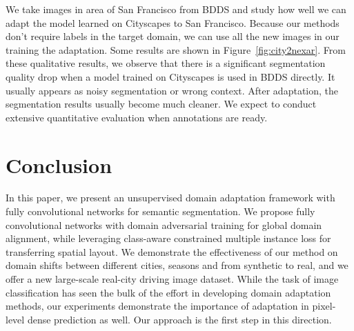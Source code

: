 \documentclass[10pt,twocolumn,letterpaper]{article}
\begin{document}
We take  images in area of San Francisco from BDDS and study how well we can adapt the model learned on Cityscapes to San Francisco. Because our methods don't require labels in the target domain, we can use all the new images in our training the adaptation. Some results are shown in Figure~\ref{fig:city2nexar}. From these qualitative results, we observe that there is a significant segmentation quality drop when a model trained on Cityscapes is used in BDDS directly. It usually appears as noisy segmentation or wrong context. After adaptation, the segmentation results usually become much cleaner. We expect to conduct extensive quantitative evaluation when annotations are ready.

















 \section{Conclusion}
\label{sec:conclusion}

In this paper, we present an unsupervised domain adaptation framework with fully convolutional networks for semantic segmentation. We propose fully convolutional networks with domain adversarial training for global domain alignment, while leveraging class-aware constrained multiple instance loss for transferring spatial layout. We demonstrate the effectiveness of our method on domain shifts between different cities, seasons and from synthetic to real, and we offer a new large-scale real-city driving image dataset. While the task of image classification has seen the bulk of the effort in developing domain adaptation methods, our experiments demonstrate the importance of adaptation in pixel-level dense prediction as well. Our approach is the first step in this direction. 

\clearpage

\begin{spacing}{1.15}
\small


\end{spacing}
\end{document}
